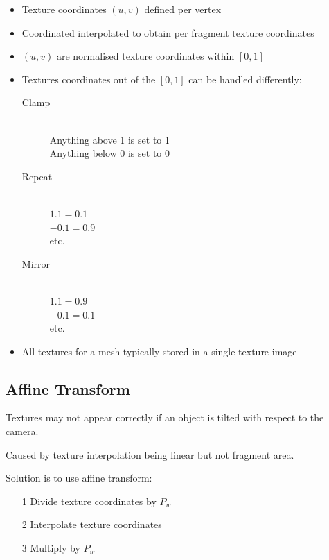\documentclass[a4paper]{article}
\begin{document}
\begin{itemize}
  \item
    Texture coordinates $(u, v)$ defined per vertex

  \item
    Coordinated interpolated to obtain per fragment texture coordinates

  \item
    $(u, v)$ are normalised texture coordinates within $[0, 1]$

  \item
    Textures coordinates out of the $[0, 1]$ can be handled differently:

    \begin{description}
      \item[Clamp] \hfill \\
        Anything above 1 is set to 1 \\
        Anything below 0 is set to 0

      \item[Repeat] \hfill \\
        $1.1 = 0.1$ \\
        $-0.1 = 0.9$ \\
        etc.

      \item[Mirror] \hfill \\
        $1.1 = 0.9$ \\
        $-0.1 = 0.1$ \\
        etc.

    \end{description}

  \item
    All textures for a mesh typically stored in a single texture image

\end{itemize}

\subsection{Affine Transform}

Textures may not appear correctly if an object is tilted with respect to the
camera.

Caused by texture interpolation being linear but not fragment area.

Solution is to use affine transform:

\begin{enumerate}
  \item[1]
    Divide texture coordinates by $P_{w}$

  \item[2]
    Interpolate texture coordinates

  \item[3]
    Multiply by $P_{w}$

\end{enumerate}
\end{document}
